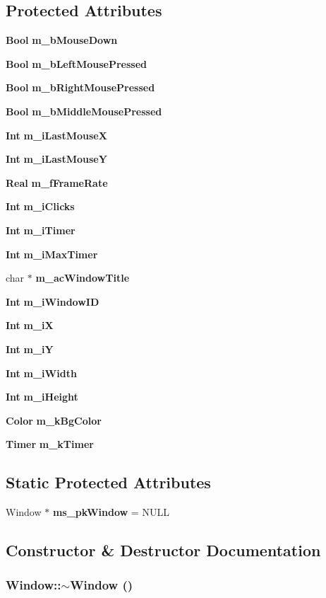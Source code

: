 \subsection*{Protected Attributes}
\begin{CompactItemize}
\item 
{\bf Bool} {\bf m\_\-b\-Mouse\-Down}
\item 
{\bf Bool} {\bf m\_\-b\-Left\-Mouse\-Pressed}
\item 
{\bf Bool} {\bf m\_\-b\-Right\-Mouse\-Pressed}
\item 
{\bf Bool} {\bf m\_\-b\-Middle\-Mouse\-Pressed}
\item 
{\bf Int} {\bf m\_\-i\-Last\-Mouse\-X}
\item 
{\bf Int} {\bf m\_\-i\-Last\-Mouse\-Y}
\item 
{\bf Real} {\bf m\_\-f\-Frame\-Rate}
\item 
{\bf Int} {\bf m\_\-i\-Clicks}
\item 
{\bf Int} {\bf m\_\-i\-Timer}
\item 
{\bf Int} {\bf m\_\-i\-Max\-Timer}
\item 
char $\ast$ {\bf m\_\-ac\-Window\-Title}
\item 
{\bf Int} {\bf m\_\-i\-Window\-ID}
\item 
{\bf Int} {\bf m\_\-i\-X}
\item 
{\bf Int} {\bf m\_\-i\-Y}
\item 
{\bf Int} {\bf m\_\-i\-Width}
\item 
{\bf Int} {\bf m\_\-i\-Height}
\item 
{\bf Color} {\bf m\_\-k\-Bg\-Color}
\item 
{\bf Timer} {\bf m\_\-k\-Timer}
\end{CompactItemize}
\subsection*{Static Protected Attributes}
\begin{CompactItemize}
\item 
Window $\ast$ {\bf ms\_\-pk\-Window} = NULL
\end{CompactItemize}


\subsection{Constructor \& Destructor Documentation}
\subsubsection{\setlength{\rightskip}{0pt plus 5cm}Window::$\sim$Window ()\hspace{0.3cm}{\tt  [virtual]}}\label{classdg_1_1Window_a0}




